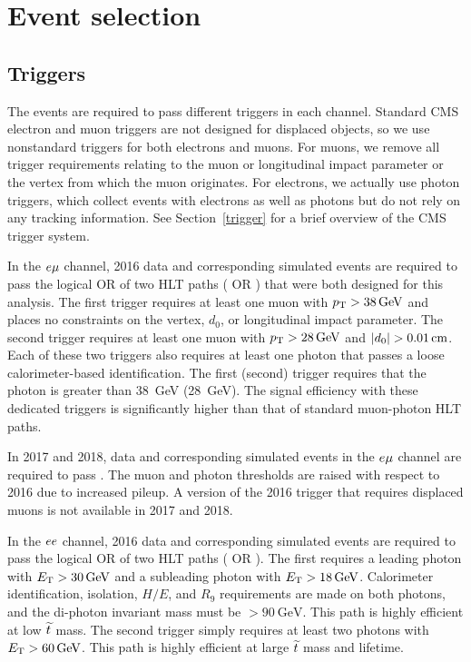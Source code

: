 \section{Event selection}
\label{selection}
\subsection{Triggers}
The events are required to pass different triggers in each channel. Standard CMS electron and muon triggers are not designed for displaced objects, so we use nonstandard triggers for both electrons and muons. For muons, we remove all trigger requirements relating to the muon \ad or longitudinal impact parameter or the vertex from which the muon originates. For electrons, we actually use photon triggers, which collect events with electrons as well as photons but do not rely on any tracking information. See Section~\ref{trigger} for a brief overview of the CMS trigger system.

In the $e{\mu}$ channel, 2016 data and corresponding simulated events are required to pass the logical OR of two HLT paths ( OR ) that were both designed for this analysis. The first trigger requires at least one muon with $\pt>\SI{38}{\GeV}$ and places no constraints on the vertex, $d_0$, or  longitudinal impact parameter. The second trigger requires at least one muon with $\pt>\SI{28}{\GeV}$ and $\ad>\SI{0.01}{\cm}$. Each of these two triggers also requires at least one photon that passes a loose calorimeter-based identification. The first (second) trigger requires that the photon \ET is greater than \SI{38}{\GeV} (\SI{28}{\GeV}). The signal efficiency with these dedicated triggers is significantly higher than that of standard muon-photon HLT paths.

In 2017 and 2018, data and corresponding simulated events in the $e{\mu}$ channel are required to pass . The muon \pt and photon \ET thresholds are raised with respect to 2016 due to increased pileup. A version of the 2016 trigger that requires displaced muons is not available in 2017 and 2018.

In the $ee$ channel, 2016 data and corresponding simulated events are required to pass the logical OR of two HLT paths ( OR  ). The first requires a leading photon with $E_{\mathrm{T}}>30\,\text{Ge\hspace{-.08em}V}$ and a subleading photon with $\ET>\SI{18}{\GeV}$. Calorimeter identification, isolation, $H/E$, and $R_9$ requirements are made on both photons, and the di-photon invariant mass must be $>\SI{90}{\GeV}$. This path is highly efficient at low $\widetilde{t}$ mass. The second trigger simply requires at least two photons with $\ET>\SI{60}{\GeV}$. This path is highly efficient at large $\widetilde{t}$ mass and lifetime.

